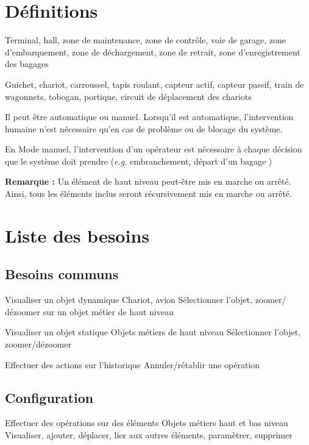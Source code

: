 \section{Définitions}
{Terminal, hall,  zone de maintenance, zone de contrôle, voie de garage, zone d'embarquement, zone de déchargement, zone de retrait, zone d'enregistrement des bagages}


{Guichet, chariot, carroussel, tapis roulant, capteur actif, capteur passif,  train de wagonnets, tobogan, portique, circuit de déplacement des chariots}


{
Il peut être automatique ou manuel. Lorsqu'il est automatique, l'intervention humaine n'est nécessaire qu'en cas de problème ou de blocage du système.

En Mode manuel, l'intervention d'un opérateur est nécessaire à chaque décision que le système doit prendre (\textsl{e.g.} embranchement, départ d'un bagage )
}

\textbf{Remarque :} Un élément de haut niveau peut-être mis en marche ou arrêté. Ainsi, tous les éléments inclus seront récursivement mis en marche ou arrêté.

\section{Liste des besoins}
\subsection{Besoins communs}
\nBesoin
{Visualiser un objet dynamique}
{Chariot, avion}
{Sélectionner l'objet, zoomer/ dézoomer sur un objet métier de haut niveau}

\nBesoin
{Visualiser un objet statique}
{Objets métiers de haut niveau}
{Sélectionner l'objet, zoomer/dézoomer}

\nBesoin
{Effectuer des actions sur l'historique}
{}
{Annuler/rétablir une opération}

\subsection{Configuration}
\setcounter{cntBesoins}{1}

\nBesoin
{Effectuer des opérations sur des éléments}
{Objets métiers haut et bas niveau}
{Visualiser, ajouter, déplacer, lier aux autres éléments, paramètrer, supprimer}

